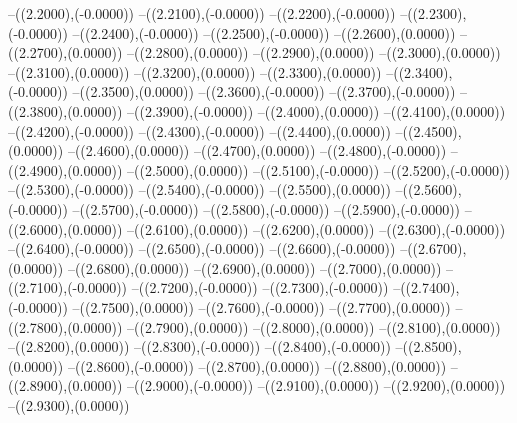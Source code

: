 {	--({\sx*(2.2000)},{\sy*(-0.0000)})
	--({\sx*(2.2100)},{\sy*(-0.0000)})
	--({\sx*(2.2200)},{\sy*(-0.0000)})
	--({\sx*(2.2300)},{\sy*(-0.0000)})
	--({\sx*(2.2400)},{\sy*(-0.0000)})
	--({\sx*(2.2500)},{\sy*(-0.0000)})
	--({\sx*(2.2600)},{\sy*(0.0000)})
	--({\sx*(2.2700)},{\sy*(0.0000)})
	--({\sx*(2.2800)},{\sy*(0.0000)})
	--({\sx*(2.2900)},{\sy*(0.0000)})
	--({\sx*(2.3000)},{\sy*(0.0000)})
	--({\sx*(2.3100)},{\sy*(0.0000)})
	--({\sx*(2.3200)},{\sy*(0.0000)})
	--({\sx*(2.3300)},{\sy*(0.0000)})
	--({\sx*(2.3400)},{\sy*(-0.0000)})
	--({\sx*(2.3500)},{\sy*(0.0000)})
	--({\sx*(2.3600)},{\sy*(-0.0000)})
	--({\sx*(2.3700)},{\sy*(-0.0000)})
	--({\sx*(2.3800)},{\sy*(0.0000)})
	--({\sx*(2.3900)},{\sy*(-0.0000)})
	--({\sx*(2.4000)},{\sy*(0.0000)})
	--({\sx*(2.4100)},{\sy*(0.0000)})
	--({\sx*(2.4200)},{\sy*(-0.0000)})
	--({\sx*(2.4300)},{\sy*(-0.0000)})
	--({\sx*(2.4400)},{\sy*(0.0000)})
	--({\sx*(2.4500)},{\sy*(0.0000)})
	--({\sx*(2.4600)},{\sy*(0.0000)})
	--({\sx*(2.4700)},{\sy*(0.0000)})
	--({\sx*(2.4800)},{\sy*(-0.0000)})
	--({\sx*(2.4900)},{\sy*(0.0000)})
	--({\sx*(2.5000)},{\sy*(0.0000)})
	--({\sx*(2.5100)},{\sy*(-0.0000)})
	--({\sx*(2.5200)},{\sy*(-0.0000)})
	--({\sx*(2.5300)},{\sy*(-0.0000)})
	--({\sx*(2.5400)},{\sy*(-0.0000)})
	--({\sx*(2.5500)},{\sy*(0.0000)})
	--({\sx*(2.5600)},{\sy*(-0.0000)})
	--({\sx*(2.5700)},{\sy*(-0.0000)})
	--({\sx*(2.5800)},{\sy*(-0.0000)})
	--({\sx*(2.5900)},{\sy*(-0.0000)})
	--({\sx*(2.6000)},{\sy*(0.0000)})
	--({\sx*(2.6100)},{\sy*(0.0000)})
	--({\sx*(2.6200)},{\sy*(0.0000)})
	--({\sx*(2.6300)},{\sy*(-0.0000)})
	--({\sx*(2.6400)},{\sy*(-0.0000)})
	--({\sx*(2.6500)},{\sy*(-0.0000)})
	--({\sx*(2.6600)},{\sy*(-0.0000)})
	--({\sx*(2.6700)},{\sy*(0.0000)})
	--({\sx*(2.6800)},{\sy*(0.0000)})
	--({\sx*(2.6900)},{\sy*(0.0000)})
	--({\sx*(2.7000)},{\sy*(0.0000)})
	--({\sx*(2.7100)},{\sy*(-0.0000)})
	--({\sx*(2.7200)},{\sy*(-0.0000)})
	--({\sx*(2.7300)},{\sy*(-0.0000)})
	--({\sx*(2.7400)},{\sy*(-0.0000)})
	--({\sx*(2.7500)},{\sy*(0.0000)})
	--({\sx*(2.7600)},{\sy*(-0.0000)})
	--({\sx*(2.7700)},{\sy*(0.0000)})
	--({\sx*(2.7800)},{\sy*(0.0000)})
	--({\sx*(2.7900)},{\sy*(0.0000)})
	--({\sx*(2.8000)},{\sy*(0.0000)})
	--({\sx*(2.8100)},{\sy*(0.0000)})
	--({\sx*(2.8200)},{\sy*(0.0000)})
	--({\sx*(2.8300)},{\sy*(-0.0000)})
	--({\sx*(2.8400)},{\sy*(-0.0000)})
	--({\sx*(2.8500)},{\sy*(0.0000)})
	--({\sx*(2.8600)},{\sy*(-0.0000)})
	--({\sx*(2.8700)},{\sy*(0.0000)})
	--({\sx*(2.8800)},{\sy*(0.0000)})
	--({\sx*(2.8900)},{\sy*(0.0000)})
	--({\sx*(2.9000)},{\sy*(-0.0000)})
	--({\sx*(2.9100)},{\sy*(0.0000)})
	--({\sx*(2.9200)},{\sy*(0.0000)})
	--({\sx*(2.9300)},{\sy*(0.0000)})
}

